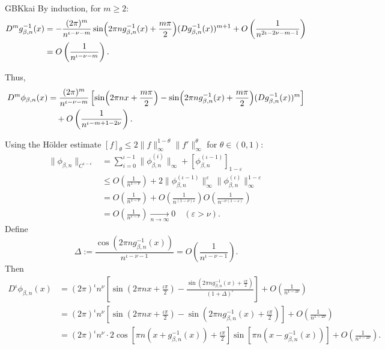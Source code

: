\documentclass{amsart}
\theoremstyle{definition}
\begin{document}
\begin{CJK*}{GBK}{kai}
By induction, for $m \geq 2$:
\begin{align*}
D^{m}g_{\beta,n}^{-1}(x) &= -\frac{(2\pi)^m}{n^{\iota-\nu-m}}\sin\Bigl(2\pi n g_{\beta,n}^{-1}(x)+\frac{m\pi}{2}\Bigr)(Dg_{\beta,n}^{-1}(x))^{m+1}
+ O\left(\frac{1}{n^{2\iota-2\nu-m-1}}\right)\\
&= O\left(\frac{1}{n^{\iota-\nu-m}}\right).
\end{align*}

Thus,
\begin{align*}
D^{m}\phi_{\beta,n}(x) &= \frac{(2\pi)^m}{n^{\iota-\nu-m}}\left[\sin\Bigl(2\pi n x + \frac{m\pi}{2}\Bigr)
- \sin\Bigl(2\pi n g_{\beta,n}^{-1}(x)+\frac{m\pi}{2}\Bigr)(Dg_{\beta,n}^{-1}(x))^m\right] \\
&\quad + O\left(\frac{1}{n^{\iota-m+1-2\nu}}\right).
\end{align*}

Using the H\"{o}lder estimate $[f]_\theta \leq 2\|f\|_\infty^{1-\theta}\|f'\|_\infty^\theta$ for $\theta \in (0,1)$:
\begin{align*}
\|\phi_{\beta,n}\|_{C^{\iota-\varepsilon}} &= \sum_{i=0}^{\iota-1}\|\phi_{\beta,n}^{(i)}\|_\infty + [\phi_{\beta,n}^{(\iota-1)}]_{1-\varepsilon} \\
&\leq O\left(\frac{1}{n^{1-\nu}}\right) + 2\|\phi_{\beta,n}^{(\iota-1)}\|_\infty^\varepsilon \|\phi_{\beta,n}^{(\iota)}\|_\infty^{1-\varepsilon} \\
&= O\left(\frac{1}{n^{1-\nu}}\right) + O\left(\frac{1}{n^{(1-\nu)\varepsilon}}\right)O\left(\frac{1}{n^{-\nu(1-\varepsilon)}}\right) \\
&= O\left(\frac{1}{n^{\varepsilon-\nu}}\right) \xrightarrow[n\to\infty]{} 0 \quad (\varepsilon > \nu).
\end{align*}
Define
\[
\Delta := \frac{\cos\left(2\pi n g_{\beta,n}^{-1}(x)\right)}{n^{\iota-\nu-1}} = O\left(\frac{1}{n^{\iota-\nu-1}}\right).
\]
Then
\begin{align*}
D^{\iota}\phi_{\beta,n}(x)
&= (2\pi)^{\iota} n^{\nu} \left[\sin\left(2\pi n x + \frac{\iota\pi}{2}\right)
- \frac{\sin\left(2\pi n g_{\beta,n}^{-1}(x) + \frac{\iota\pi}{2}\right)}{(1+\Delta)^{\iota}}\right]
+ O\left(\frac{1}{n^{1-2\nu}}\right) \\
&= (2\pi)^{\iota} n^{\nu} \left[\sin\left(2\pi n x + \frac{\iota\pi}{2}\right)
- \sin\left(2\pi n g_{\beta,n}^{-1}(x) + \frac{\iota\pi}{2}\right)\right]
+ O\left(\frac{1}{n^{1-2\nu}}\right) \\
&= (2\pi)^{\iota} n^{\nu} \cdot 2\cos\left[\pi n (x+g_{\beta,n}^{-1}(x)) + \frac{\iota\pi}{2}\right]
\sin\left[\pi n (x-g_{\beta,n}^{-1}(x))\right]
+ O\left(\frac{1}{n^{1-2\nu}}\right).
\end{align*}


\end{CJK*}
\end{document}
